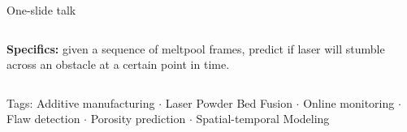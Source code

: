\documentclass{beamer}
\begin{document}
\begin{frame}{One-slide talk}
\begin{columns}[c]
    \textbf{Specifics:} given a sequence of meltpool frames, predict if laser will stumble across an obstacle at a certain point in time.
    

\end{columns}

{\footnotesize {\color{red} Tags:} Additive manufacturing $\cdot{}$ Laser Powder Bed Fusion $\cdot{}$ Online monitoring $\cdot{}$ Flaw detection $\cdot{}$ Porosity prediction $\cdot{}$ Spatial-temporal Modeling}
\end{frame}


\end{document}
